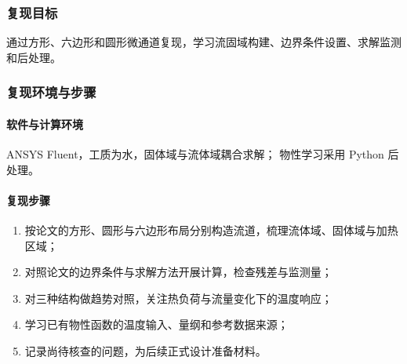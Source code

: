\documentclass[stage1,fontset=fandol]{ydzjreport}
\begin{document}
\subsubsection{复现目标}

通过方形、六边形和圆形微通道复现，学习流固域构建、边界条件设置、求解监测和后处理。

\subsubsection{复现环境与步骤}

	\paragraph{软件与计算环境}
ANSYS Fluent，工质为水，固体域与流体域耦合求解；
	物性学习采用 Python 后处理。

	\paragraph{复现步骤}


	\begin{enumerate}
		\item 按论文的方形、圆形与六边形布局分别构造流道，梳理流体域、固体域与加热区域；
		\item 对照论文的边界条件与求解方法开展计算，检查残差与监测量；
		\item 对三种结构做趋势对照，关注热负荷与流量变化下的温度响应；
		\item 学习已有物性函数的温度输入、量纲和参考数据来源；
		\item 记录尚待核查的问题，为后续正式设计准备材料。
	\end{enumerate}
\end{document}
